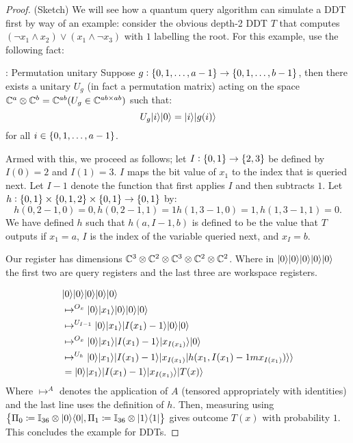 \begin{proof}
    (Sketch) We will see how a quantum query algorithm can simulate a DDT first by way of an example: consider
    the obvious depth-2 DDT $T$ that computes $(\lnot x_1 \land x_2) \lor (x_1 \land \lnot x_3)$ with $1$ labelling the root. For this example, use the following fact:

\begin{factbox}{: Permutation unitary}
    Suppose $g: \set{0, 1, \ldots, a-1} \to \set{0, 1, \ldots, b-1}$, then there exists a unitary $U_g$ (in fact a permutation matrix) acting on the space $\mathbb{C}^a \otimes \mathbb{C}^b = \mathbb{C}^{ab}(U_g \in \mathbb{C}^{ab \times ab})$ such that:
    \begin{equation}
        U_g\lvert i \rangle\lvert 0 \rangle = \lvert i \rangle\lvert g(i) \rangle
    \end{equation}
    for all $i \in \set{0, 1, \ldots, a-1}$.
\end{factbox}

Armed with this, we proceed as follows; let $I: \set{0, 1} \to \set{2, 3}$ be defined by $I(0) = 2$ and $I(1) = 3$. $I$ maps the bit value of $x_1$ to the index that is queried next. Let $I-1$ denote the function that first applies $I$ and then subtracts $1$. Let $h: \set{0, 1} \times \set{0, 1, 2} \times \set{0, 1} \to \set{0, 1}$ by:
\begin{equation}
    h(0, 2-1, 0) = 0, h(0, 2-1, 1) = 1 h(1, 3-1, 0) = 1, h(1, 3-1, 1) = 0.
\end{equation}
We have defined $h$ such that $h(a, I-1, b)$ is defined to be the value that $T$ outputs if $x_1 = a$, $I$ is the index of the variable queried next, and $x_I = b$.

Our register has dimensions $\mathbb{C}^3 \otimes \mathbb{C}^2 \otimes \mathbb{C}^3 \otimes \mathbb{C}^2 \otimes \mathbb{C}^2$. Where in $\lvert 0 \rangle\lvert 0 \rangle\lvert 0 \rangle\lvert 0 \rangle\lvert 0 \rangle$ the first two are query registers and the last three are workspace registers.

\begin{align*}
    &\lvert 0 \rangle\lvert 0 \rangle\lvert 0 \rangle\lvert 0 \rangle\lvert 0 \rangle
    \\ &\mapsto^{O_x} \lvert 0 \rangle\lvert x_1 \rangle\lvert 0 \rangle\lvert 0 \rangle\lvert 0 \rangle
    \\ &\mapsto^{U_{I-1}} \lvert 0 \rangle\lvert x_1 \rangle\lvert I(x_1) - 1 \rangle\lvert 0 \rangle\lvert 0 \rangle
    \\ &\mapsto^{O_x} \lvert 0 \rangle\lvert x_1 \rangle\lvert I(x_1) - 1 \rangle\lvert x_{I(x_1)} \rangle\lvert 0 \rangle
    \\ &\mapsto^{U_h} \lvert 0 \rangle\lvert x_1 \rangle\lvert I(x_1) - 1 \rangle\lvert x_{I(x_1)}\lvert h(x_1, I(x_1) - 1m x_{I(x_1)}) \rangle \rangle
    \\ &= \lvert 0 \rangle\lvert x_1 \rangle\lvert I(x_1) - 1 \rangle\lvert x_{I(x_1)} \rangle\lvert T(x) \rangle
\end{align*}
Where $\mapsto^A$ denotes the application of $A$ (tensored appropriately with identities) and the last line uses the definition of $h$. Then, measuring using $\set{\Pi_0 \coloneqq \mathbb{I}_{36} \otimes \lvert 0 \rangle \langle 0 \rvert, \Pi_1 \coloneqq \mathbb{I}_{36} \otimes \lvert 1 \rangle \langle 1 \rvert}$ gives outcome $T(x)$ with probability $1$. This concludes the example for DDTs.


\end{proof}

